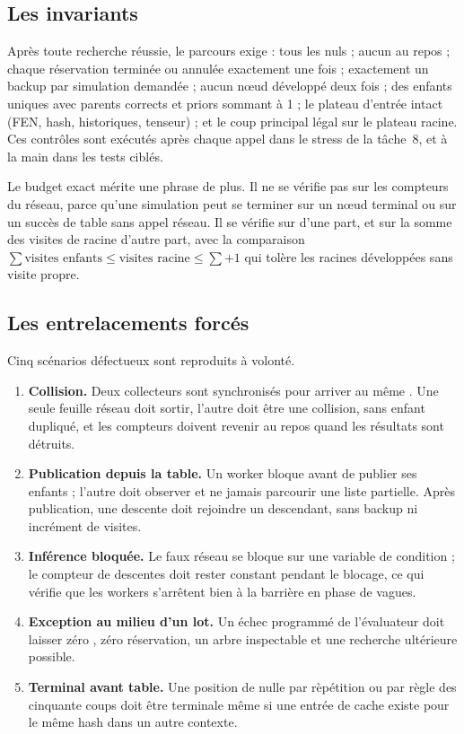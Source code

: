 \subsection{Les invariants}

Apr\`es toute recherche r\'eussie, le parcours  exige :
tous les  nuls ; aucun  au repos ; chaque
r\'eservation termin\'ee ou annul\'ee exactement une fois ; exactement un
backup par simulation demand\'ee ; aucun n\oe{}ud d\'evelopp\'e deux fois ;
des enfants uniques avec parents corrects et priors sommant \`a 1 ; le
plateau d'entr\'ee intact (FEN, hash, historiques, tenseur) ; et le coup
principal l\'egal sur le plateau racine. Ces contr\^oles sont ex\'ecut\'es
apr\`es chaque appel dans le stress de la t\^ache~8, et \`a la main dans les
tests cibl\'es.

Le budget exact m\'erite une phrase de plus. Il ne se v\'erifie pas sur les
compteurs du r\'eseau, parce qu'une simulation peut se terminer sur un
n\oe{}ud terminal ou sur un succ\`es de table sans appel r\'eseau. Il se
v\'erifie sur  d'une part, et sur la somme des
visites de racine d'autre part, avec la comparaison
$\sum \text{visites enfants} \le \text{visites racine} \le \sum + 1$ qui
tol\`ere les racines d\'evelopp\'ees sans visite propre.

\subsection{Les entrelacements forc\'es}

Cinq sc\'enarios d\'efectueux sont reproduits \`a volont\'e.

\begin{enumerate}[leftmargin=1.4em]
  \item \textbf{Collision.} Deux collecteurs sont synchronis\'es pour arriver
  au m\^eme . Une seule feuille r\'eseau doit sortir,
  l'autre doit \^etre une collision, sans enfant dupliqu\'e, et les compteurs
  doivent revenir au repos quand les r\'esultats sont d\'etruits.
  \item \textbf{Publication depuis la table.} Un worker bloque avant de
  publier ses enfants ; l'autre doit observer  et ne jamais
  parcourir une liste partielle. Apr\`es publication, une descente doit
  rejoindre un descendant, sans backup ni incr\'ement de visites.
  \item \textbf{Inf\'erence bloqu\'ee.} Le faux r\'eseau se bloque sur une
  variable de condition ; le compteur de descentes doit rester constant
  pendant le blocage, ce qui v\'erifie que les workers s'arr\^etent bien \`a la
  barri\`ere en phase de vagues.
  \item \textbf{Exception au milieu d'un lot.} Un \'echec programm\'e de
  l'\'evaluateur doit laisser z\'ero , z\'ero r\'eservation, un
  arbre inspectable et une recherche ult\'erieure possible.
  \item \textbf{Terminal avant table.} Une position de nulle par r\`ep\'etition
  ou par r\`egle des cinquante coups doit \^etre terminale m\^eme si une
  entr\'ee de cache existe pour le m\^eme hash dans un autre contexte.
\end{enumerate}

